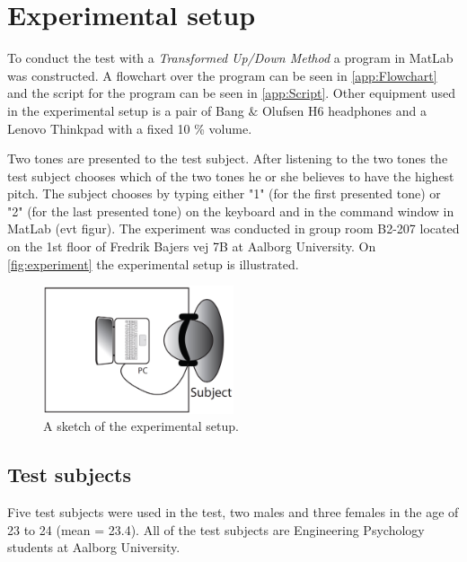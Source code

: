 \section*{Experimental setup}
%
To conduct the test with a \textit{Transformed Up/Down Method} a program in MatLab was constructed. A flowchart over the program can be seen in \autoref{app:Flowchart} and the script for the program can be seen in \autoref{app:Script}. Other equipment used in the experimental setup is a pair of Bang $\&$ Olufsen H6 headphones and a Lenovo Thinkpad with a fixed 10 \% volume.

Two tones are presented to the test subject. After listening to the two tones the test subject chooses which of the two tones he or she believes to have the highest pitch. The subject chooses by typing either "1" (for the first presented tone) or "2" (for the last presented tone) on the keyboard and in the command window in MatLab (evt figur).\blankline
%
% 
\noindent
The experiment was conducted in group room B2-207 located on the 1st floor of Fredrik Bajers vej 7B at Aalborg University. On \autoref{fig:experiment} the experimental setup is illustrated. 
%
\begin{figure}[H]
\centering
\includegraphics[width = 0.5\textwidth]{Figure/experiment.png} 
\caption{A sketch of the experimental setup.}
\label{fig:experiment}
\end{figure}
%

\subsection*{Test subjects}
%
Five test subjects were used in the test, two males and three females in the age of 23 to 24 (mean = 23.4). All of the test subjects are Engineering Psychology students at Aalborg University. 